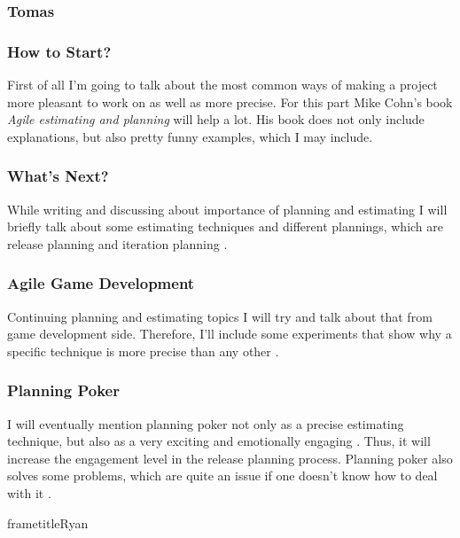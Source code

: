 \documentclass{beamer}
\begin{document}
\begin{frame}
 	\frametitle{Tomas}
\end{frame}

\begin{frame}
\frametitle{How to Start?}
First of all I'm going to talk about the most common ways of 
making a project more pleasant to work on as well as more
precise. For this part Mike Cohn's book \textit{Agile estimating and planning}
will help a lot. \cite{cohn2005book} His book does not only include 
explanations, but also pretty funny examples, which I may include.
\end{frame}

\begin{frame}
\frametitle{What's Next?}
While writing and discussing about importance of planning and estimating I will
briefly talk about some estimating techniques \cite{molokken2007combining}
\cite{tamrakar2012does} and different plannings, which
are release planning and iteration planning \cite{cohn2005book}.
\end{frame}

\begin{frame}
\frametitle{Agile Game Development}
Continuing planning and estimating topics I will try and talk 
about that from game development side. Therefore, I'll include
some experiments that show why a specific technique is more
precise than any other \cite{haugen2006empirical}\cite{grapenthin2016supporting}.
\end{frame}

\begin{frame}
\frametitle{Planning Poker}
I will eventually mention planning poker not only as a 
precise estimating technique, but also as a very exciting
and emotionally engaging \cite{yip2007hands}. Thus, it will 
increase the engagement level in the release planning process.
Planning poker also solves some problems, which are quite an
issue if one doesn't know how to deal with it \cite{grenning2002planning}.
\end{frame}





	\begin{frame}
		frametitle{Ryan}
	\end{frame}
\end{document}
